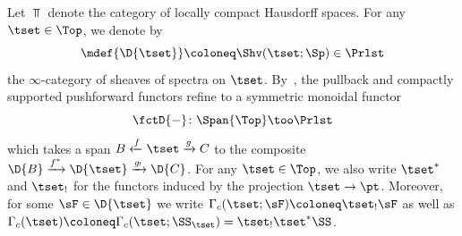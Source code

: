  Let $\Top$ denote the category of locally compact Hausdorff spaces. For any $\tset\in \Top$, we denote by
\[\mdef{\D{\tset}}\coloneq \Shv(\tset;\Sp) \in \Prlst\]
the $\infty$-category of sheaves of spectra on $\tset$.
By~\cite{Volpe2023}, the pullback and compactly supported pushforward functors refine to a
symmetric monoidal functor
\[\fctD{-}\colon \Span{\Top} \too \Prlst\]
which takes a span $ B \xleftarrow{f}\tset \xrightarrow{g} C$ to the composite
$\D{B} \xrightarrow{f^{\ast}} \D{\tset} \xrightarrow{g_!}\D{C}$. For any $\tset\in \Top$, we
also write $\tset^{\ast}$ and $\tset_!$ for the functors induced by the projection $\tset\to \pt$.
Moreover, for some $\sF\in \D{\tset}$ we write $\Gamma_{c}(\tset;\sF)\coloneq \tset_! \sF$ as well as
$\Gamma_c(\tset)\coloneq \Gamma_c(\tset;\SS_\tset)= \tset_!\tset^{\ast}\SS$.

